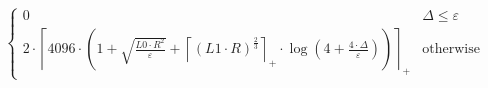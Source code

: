 \[\begin{cases} 0 & \Delta \leq \varepsilon \\ 2 \cdot \left\lceil 4096 \cdot \left(1 + \sqrt{\frac{L0 \cdot R^{2}}{\varepsilon}} + \left\lceil \left(L1 \cdot R\right)^{\frac{2}{3}} \right\rceil_{+} \cdot \log\left(4 + \frac{4 \cdot \Delta}{\varepsilon}\right)\right) \right\rceil_{+} & \mathrm{otherwise} \end{cases}\]
